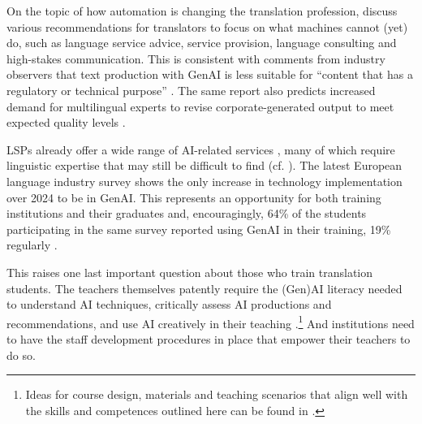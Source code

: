 \documentclass[output=paper]{langscibook}
\begin{document}
On the topic of how automation is changing the translation profession, \citet{PymTorresSimón2021} discuss various recommendations for translators to focus on what machines cannot (yet) do, such as language service advice, service provision, language consulting and high-stakes communication. This is consistent with comments from industry observers that text production with GenAI is less suitable for “content that has a regulatory or technical purpose” \citep[75]{slator_slator_2024}. The same report also predicts increased demand for multilingual experts to revise corporate-generated output to meet expected quality levels \citep[63]{slator_slator_2024}.

LSPs already offer a wide range of AI-related services \citep[101]{slator_slator_2024}, many of which require linguistic expertise that may still be difficult to find (cf. \citealt{faes_slator_2024}). The latest European language industry survey \citep[34]{elis_elis_2025} shows the only increase in technology implementation over 2024 to be in GenAI. This represents an opportunity for both training institutions and their graduates and, encouragingly, 64\% of the students participating in the same survey reported using GenAI in their training, 19\% regularly \citep[37]{elis_elis_2025}. 

This raises one last important question about those who train translation students. The teachers themselves patently require the (Gen)AI literacy needed to understand AI techniques, critically assess AI productions and recommendations, and use AI creatively in their teaching \citep[401]{oecd_opportunities_2023}.\footnote{Ideas for course design, materials and teaching scenarios that align well with the skills and competences outlined here can be found in \citet{pym_how_2025}.} And institutions need to have the staff development procedures in place that empower their teachers to do so.
\end{document}
